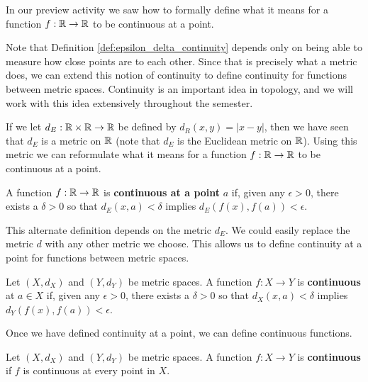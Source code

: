 In our preview activity we saw how to formally define what it means for a function $f : \mathbb{R} \to \mathbb{R}$ to be continuous at a point. 


Note that Definition \ref{def:epsilon_delta_continuity} depends only on being able to measure how close points are to each other. Since that is precisely what a metric does, we can extend this notion of continuity to define continuity for functions between metric spaces. Continuity is an important idea in topology, and we will work with this idea extensively throughout the semester.
 
If we let $d_E : \mathbb{R} \times \mathbb{R} \to \mathbb{R}$ be defined by $d_R(x,y) = | x - y |$, then we have seen that $d_E$ is a metric on $\mathbb{R}$ (note that $d_E$ is the Euclidean metric on $\mathbb{R}$). Using this metric we can reformulate what it means for a function $f : \mathbb{R} \to \mathbb{R}$ to be continuous at a point.

\begin{definition} A function $f : \mathbb{R} \to \mathbb{R}$ is \textbf{continuous at a point} $a$ if, given any $\epsilon > 0$, there exists a $\delta > 0$ so that $d_E(x,a) < \delta$ implies $d_E(f(x), f(a)) < \epsilon$.
\end{definition}

This alternate definition depends on the metric $d_E$. We could easily replace the metric $d$ with any other metric we choose. This allows us to define continuity at a point for functions between metric spaces.

\begin{definition} Let $(X,d_X)$ and $(Y, d_Y)$ be metric spaces. A function $f:X \to Y$ is \textbf{continuous} at $a \in X$ if, given any $\epsilon > 0$, there exists a $\delta > 0$ so that $d_X(x,a)< \delta$ implies $d_Y(f(x), f(a)) < \epsilon$.  
\end{definition}

Once we have defined continuity at a point, we can define continuous functions.

\begin{definition} Let $(X,d_X)$ and $(Y, d_Y)$ be metric spaces. A function $f:X \to Y$ is \textbf{continuous} if $f$ is continuous at every point in $X$. 
\end{definition}

